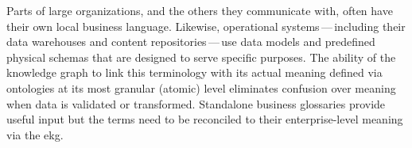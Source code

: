 %
%
Parts of large organizations, and the others they communicate with, often have their own local business language.
Likewise, operational systems\,---\,including their data warehouses and content repositories\,---\,use data models
and predefined physical schemas that are designed to serve specific purposes.
The ability of the knowledge graph to link this terminology with its actual meaning defined via ontologies at
its most granular (atomic) level eliminates confusion over meaning when data is validated or transformed.
Standalone business glossaries provide useful input but the terms need to be reconciled to their
enterprise-level meaning via the \gls{ekg}.
